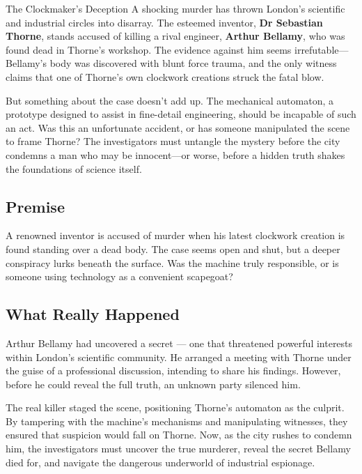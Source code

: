 \begin{WyrdScenarioHeading}{The Clockmaker's Deception}
    A shocking murder has thrown London’s scientific and industrial circles into disarray. The esteemed inventor, \textbf{Dr Sebastian Thorne}, stands accused of killing a rival engineer, \textbf{Arthur Bellamy}, who was found dead in Thorne’s workshop. The evidence against him seems irrefutable—Bellamy’s body was discovered with blunt force trauma, and the only witness claims that one of Thorne’s own clockwork creations struck the fatal blow.

    But something about the case doesn’t add up. The mechanical automaton, a prototype designed to assist in fine-detail engineering, should be incapable of such an act. Was this an unfortunate accident, or has someone manipulated the scene to frame Thorne? The investigators must untangle the mystery before the city condemns a man who may be innocent—or worse, before a hidden truth shakes the foundations of science itself.

    \subsection*{Premise} 
    A renowned inventor is accused of murder when his latest clockwork creation is found standing over a dead body. The case seems open and shut, but a deeper conspiracy lurks beneath the surface. Was the machine truly responsible, or is someone using technology as a convenient scapegoat?

    \subsection*{What Really Happened} 
    Arthur Bellamy had uncovered a secret — one that threatened powerful interests within London’s scientific community. He arranged a meeting with Thorne under the guise of a professional discussion, intending to share his findings. However, before he could reveal the full truth, an unknown party silenced him.

    The real killer staged the scene, positioning Thorne’s automaton as the culprit. By tampering with the machine’s mechanisms and manipulating witnesses, they ensured that suspicion would fall on Thorne. Now, as the city rushes to condemn him, the investigators must uncover the true murderer, reveal the secret Bellamy died for, and navigate the dangerous underworld of industrial espionage.
\end{WyrdScenarioHeading}

